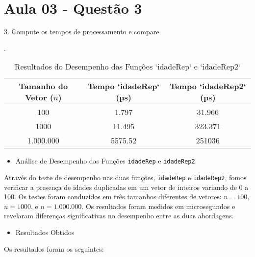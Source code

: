 \section{Aula 03 - Questão 3}

3. Compute os tempos de processamento e compare

\begin{table}[ht]
    \centering
    \caption{Resultados do Desempenho das Funções `idadeRep` e `idadeRep2`}.

    \begin{tabular}{@{}ccc@{}}
        \toprule
        Tamanho do Vetor (\(n\)) & Tempo `idadeRep` (µs) & Tempo `idadeRep2` (µs) \\ \midrule
        100       & 1.797               & 31.966               \\
        1000      & 11.495              & 323.371              \\
        1.000.000 & 5575.52             & 251036               \\ \bottomrule
    \end{tabular}
    \label{tab:resultados}
\end{table}

\begin{itemize}
    \item Análise de Desempenho das Funções \texttt{idadeRep} e \texttt{idadeRep2}
\end{itemize}
Através do teste de desempenho nas duas funções, \texttt{idadeRep} e \texttt{idadeRep2}, fomos verificar a presença de idades duplicadas em um vetor de inteiros variando de 0 a 100. Os testes foram conduzidos em três tamanhos diferentes de vetores: \( n = 100 \), \( n = 1000 \), e \( n = 1.000.000 \). Os resultados foram medidos em microsegundos e revelaram diferenças significativas no desempenho entre as duas abordagens.

\begin{itemize}
    \item Resultados Obtidos
\end{itemize}
Os resultados foram os seguintes:


